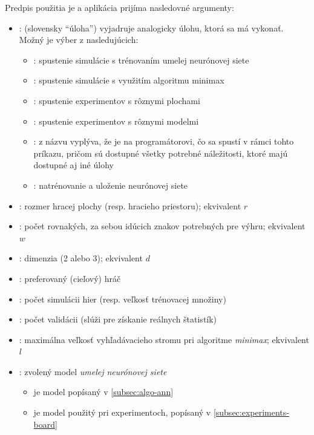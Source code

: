 Predpis použitia je  a aplikácia prijíma nasledovné
argumenty:
\begin{itemize}
    \item {}: (slovensky \enquote{úloha}) vyjadruje analogicky úlohu, ktorá sa má vykonať.
    Možný je výber z nasledujúcich:
    \begin{itemize}
        \item {}: spustenie simulácie s trénovaním umelej neurónovej siete
        \item {}: spustenie simulácie s využitím algoritmu minimax
        \item {}: spustenie experimentov s rôznymi plochami
        \item {}: spustenie experimentov s rôznymi modelmi
        \item {}: z názvu vyplýva, že je na programátorovi, čo sa spustí v rámci tohto príkazu, pričom sú
        dostupné všetky potrebné náležitosti, ktoré majú dostupné aj iné úlohy
        \item {}: natrénovanie a uloženie neurónovej siete
    \end{itemize}
    \item {}: rozmer hracej plochy (resp. hracieho priestoru); ekvivalent $r$
    \item {}: počet rovnakých, za sebou idúcich znakov potrebných pre výhru; ekvivalent $w$
    \item {}: dimenzia (2 alebo 3); ekvivalent $d$
    \item {}: preferovaný (cieľový) hráč
    \item {}: počet simulácii hier (resp. veľkosť trénovacej množiny)
    \item {}: počet validácii (slúži pre získanie reálnych štatistík)
    \item {}: maximálna veľkosť vyhľadávacieho stromu pri algoritme \emph{minimax};
    ekvivalent $l$
    \item {}: zvolený model \emph{umelej neurónovej siete}
    \begin{itemize}
        \item {} je model popísaný v \autoref{subsec:algo-ann}
        \item {} je model použitý pri experimentoch, popísaný v \autoref{subsec:experiments-board}
    \end{itemize}
\end{itemize}
